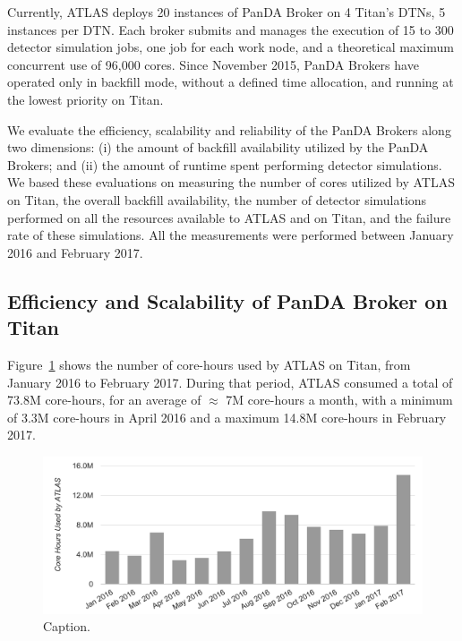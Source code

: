 Currently, ATLAS deploys 20 instances of PanDA Broker on 4 Titan's DTNs, 5
instances per DTN. Each broker submits and manages the execution of 15 to 300
detector simulation jobs, one job for each work node, and a theoretical maximum
concurrent use of 96,000 cores. Since November 2015, PanDA Brokers have operated
only in backfill mode, without a defined time allocation, and running at the
lowest priority on Titan.

We evaluate the efficiency, scalability and reliability of the PanDA Brokers
along two dimensions: (i) the amount of backfill availability utilized by the
PanDA Brokers; and (ii) the amount of 
runtime spent performing detector simulations. We based these evaluations on measuring the number
of cores utilized by ATLAS on Titan, the overall backfill availability, the
number of detector simulations performed on all the resources available to ATLAS
and on Titan, and the failure rate of these simulations. All the measurements
were performed between January 2016 and February 2017.

\subsection{Efficiency and Scalability of PanDA Broker on Titan}
\label{ssec:panda_titan}

Figure~\ref{fig:core-hours-utilization} shows the number of core-hours used by
ATLAS on Titan, from January 2016 to February 2017. During that period, ATLAS
consumed a total of 73.8M core-hours, for an average of $\approx$ 7M core-hours a month,
with a minimum of 3.3M core-hours in April 2016 and a maximum 14.8M core-hours
in February 2017.

%

\begin{figure}[htp]
\includegraphics[clip,width=\columnwidth]{figures/cpu_hours.png}
\caption{Caption.}
\label{fig:core-hours-utilization}
\end{figure}

